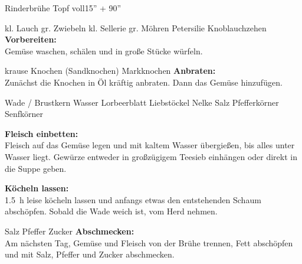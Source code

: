 \begin{MyRecipe}{Rinderbrühe}{ Topf voll}{15'' + 90''}

\ingredient[\Calc{1}{\x}]{} {kl. Lauch}
\ingredient[\Calc{2}{\x}]{} {gr. Zwiebeln}
\ingredient[\Calc{1}{\x}]{} {kl. Sellerie}
\ingredient[\Calc{3}{\x}]{} {gr. Möhren}
 {Petersilie}
\ingredient[\Calc{2}{\x}]{} {Knoblauchzehen}
\textbf{Vorbereiten:}\\
Gemüse waschen, schälen und in große Stücke würfeln.

 {krause Knochen (Sandknochen)}
 {Markknochen}
\textbf{Anbraten:}\\
Zunächst die Knochen in Öl kräftig anbraten. Dann das Gemüse hinzufügen.

 {Wade / Brustkern}
 {Wasser}
\ingredient[1]{} {Lorbeerblatt}
 {Liebstöckel}
\ingredient[\Calc{1}{\x}]{} {Nelke}
 {Salz}
 {Pfefferkörner}
 {Senfkörner}

\textbf{Fleisch einbetten:}\\
Fleisch auf das Gemüse legen und mit kaltem Wasser übergießen, bis alles unter Wasser liegt. Gewürze entweder in großzügigem Teesieb einhängen oder direkt in die Suppe geben.

\textbf{Köcheln lassen:}\\
\SI{1,5}{\hour} leise köcheln lassen und anfangs etwas den entstehenden Schaum abschöpfen. Sobald die Wade weich ist, vom Herd nehmen.\par

\ingredient[]{} {Salz}
\ingredient[]{} {Pfeffer}
\ingredient[]{} {Zucker}
\textbf{Abschmecken:}\\
Am nächsten Tag, Gemüse und Fleisch von der Brühe trennen, Fett abschöpfen und mit Salz, Pfeffer und Zucker abschmecken.









\end{MyRecipe}